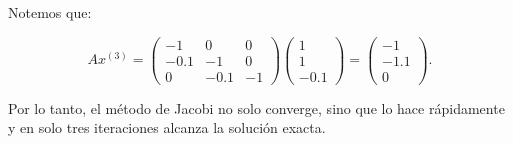 \begin{homeworkProblem}
\begin{enumerate}
\begin{solucion}
Notemos que:

\[
Ax^{(3)} = \begin{pmatrix}
            -1 & 0 & 0\\
            -0.1 & -1 & 0\\
            0 & -0.1 & -1
        \end{pmatrix}
        \begin{pmatrix}
            1 \\
            1 \\
            -0.1
        \end{pmatrix}
        =
        \begin{pmatrix}
            -1 \\
            -1.1 \\
            0
        \end{pmatrix}.
\]

Por lo tanto, el método de Jacobi no solo converge, sino que lo hace rápidamente y en solo tres iteraciones alcanza la solución exacta.  
    \end{solucion}
\end{enumerate}
\end{homeworkProblem}
